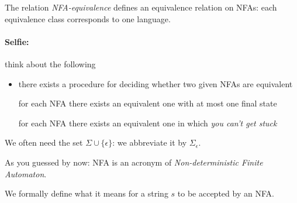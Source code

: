 
The relation {\em NFA-equivalence} defines an equivalence relation on
NFAs: each equivalence class corresponds to one language.


\paragraph{Selfie:} think about the following

\begin{itemize}
\item[] there exists a procedure for deciding whether two given NFAs
  are equivalent

for each NFA there exists an equivalent one with at most one final
state

for each NFA there exists an equivalent one in which {\em you can't
  get stuck}
\end{itemize}

We often need the set $\Sigma \cup \{\epsilon\}$: we abbreviate it by
$\Sigma_\epsilon$.


As you guessed by now: NFA is an acronym of {\em Non-deterministic Finite
  Automaton}.


We formally define what it means for a string $s$ to be accepted by an
NFA.

